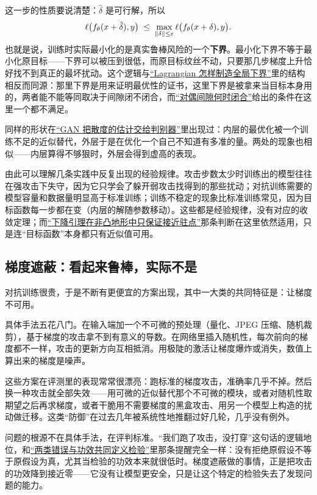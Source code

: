 这一步的性质要说清楚：\(\hat\delta\) 是可行解，所以
\[
\ell\big(f_\theta(x+\hat\delta),y\big)\;\le\;\max_{\left\lVert\delta\right\rVert\le\varepsilon}\ell\big(f_\theta(x+\delta),y\big).
\]
也就是说，训练时实际最小化的是真实鲁棒风险的一个\textbf{下界}。最小化下界不等于最小化原目标——下界可以被压到很低，而原目标纹丝不动，只要那几步梯度上升恰好找不到真正的最坏扰动。这个逻辑与\hyperref[sec:09-Convex-Optimization/05-Duality/01]{``Lagrangian 怎样制造全局下界''}里的结构相反而同源：那里下界是用来证明最优性的证书，这里下界是被拿来当目标本身用的，两者能不能等同取决于间隙闭不闭合，而\hyperref[sec:09-Convex-Optimization/05-Duality/02]{``对偶间隙何时闭合''}给出的条件在这里一个都不满足。

同样的形状在\hyperref[sec:14-Deep-Learning/07-Generative-Models-Unified/03]{``GAN 把散度的估计交给判别器''}里出现过：内层的最优化被一个训练不足的近似替代，外层于是在优化一个自己不知道有多准的量。两处的现象也相似——内层算得不够狠时，外层会得到虚高的表现。

由此可以理解几条实践中反复出现的经验规律。攻击步数太少时训练出的模型往往在强攻击下失守，因为它只学会了躲开弱攻击找得到的那些扰动；对抗训练需要的模型容量和数据量明显高于标准训练；训练不稳定的现象比标准训练常见，因为目标函数每一步都在变（内层的解随参数移动）。这些都是经验规律，没有对应的收敛定理；而\hyperref[sec:09-Convex-Optimization/08-Nonconvex-and-Stochastic-Optimization/01]{``下降引理在非凸地形中只保证接近驻点''}那条判断在这里依然适用，只是连``目标函数''本身都只有近似值可用。

\subsection{梯度遮蔽：看起来鲁棒，实际不是}

对抗训练很贵，于是不断有更便宜的方案出现，其中一大类的共同特征是：让梯度不可用。

具体手法五花八门。在输入端加一个不可微的预处理（量化、JPEG 压缩、随机裁剪），基于梯度的攻击拿不到有意义的导数。在网络里插入随机性，每次前向的梯度都不一样，攻击的更新方向互相抵消。用极陡的激活让梯度爆炸或消失，数值上算出来的梯度是噪声。

这些方案在评测里的表现常常很漂亮：跑标准的梯度攻击，准确率几乎不掉。然后换一种攻击就全部失效——用可微的近似替代那个不可微的模块，或者对随机性取期望之后再求梯度，或者干脆用不需要梯度的黑盒攻击、用另一个模型上构造的扰动做迁移。这类``防御''在过去几年被系统性地推翻过好几轮，几乎没有例外。

问题的根源不在具体手法，在评判标准。``我们跑了攻击，没打穿''这句话的逻辑地位，和\hyperref[sec:11-Mathematical-Statistics/05-Hypothesis-Testing/01]{``两类错误与功效共同定义检验''}里那条提醒完全一样：没有拒绝原假设不等于原假设为真，尤其当检验的功效本来就很低时。梯度遮蔽做的事情，正是把攻击的功效降到接近零——它没有让模型更安全，只是让这个特定的检验失去了发现问题的能力。

